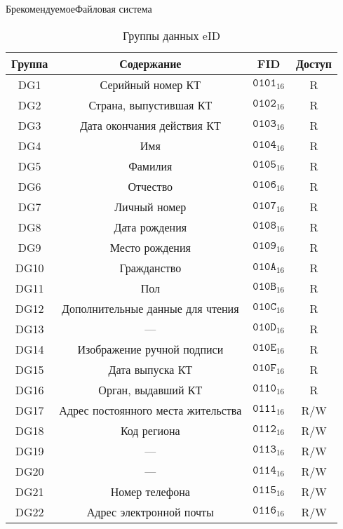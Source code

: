 \begin{appendix}{Б}{рекомендуемое}{Файловая система}
\begin{table}[H]
\caption{Группы данных eID}
\label{Table.FILES.DG}
\begin{tabular}{|c|c|c|c|}
\hline
Группа & Содержание & FID & Доступ\\
\hline
\hline
DG1 & Серийный номер КТ & 
$\texttt{0101}_{16}$ & R\\
DG2 & Страна, выпустившая КТ & 
$\texttt{0102}_{16}$ & R\\
DG3 & Дата окончания действия КТ & 
$\texttt{0103}_{16}$ & R\\
DG4 & Имя & 
$\texttt{0104}_{16}$ & R\\
DG5 & Фамилия & 
$\texttt{0105}_{16}$ & R\\
DG6 & Отчество & 
$\texttt{0106}_{16}$ & R\\
DG7 & Личный номер & 
$\texttt{0107}_{16}$ & R\\
DG8 & Дата рождения & 
$\texttt{0108}_{16}$ & R\\
DG9 & Место рождения & 
$\texttt{0109}_{16}$ & R\\
DG10 & Гражданство & 
$\texttt{010A}_{16}$ & R\\
DG11 & Пол & 
$\texttt{010B}_{16}$ & R\\
DG12 & Дополнительные данные для чтения & 
$\texttt{010C}_{16}$ & R\\
DG13 & 
--- &
$\texttt{010D}_{16}$ & R\\
DG14 & Изображение ручной подписи & 
$\texttt{010E}_{16}$ & R\\
DG15 & Дата выпуска КТ & 
$\texttt{010F}_{16}$ & R\\
DG16 & Орган, выдавший КТ &  
$\texttt{0110}_{16}$ & R\\
DG17 & 	Адрес постоянного места жительства & 
$\texttt{0111}_{16}$ & R/W\\
DG18 & 	Код региона & 
$\texttt{0112}_{16}$ & R/W\\
DG19 & 	
--- &
$\texttt{0113}_{16}$ & R/W\\
DG20 & 	
--- &
$\texttt{0114}_{16}$ & R/W\\
DG21 & 	Номер телефона & 
$\texttt{0115}_{16}$ & R/W\\
DG22 & 	Адрес электронной почты & 
$\texttt{0116}_{16}$ & R/W\\
\hline
\end{tabular}
\end{table}



\end{appendix}
